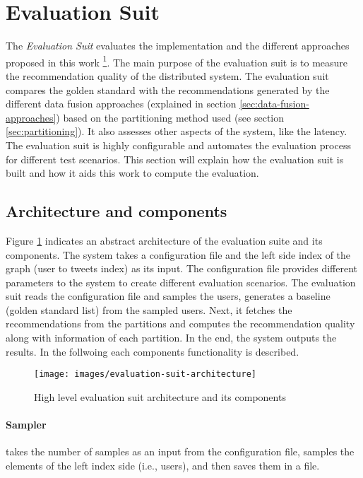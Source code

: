 \section{Evaluation Suit}
\label{sec:evaluation-suit}
The \emph{Evaluation Suit} evaluates the implementation and the different approaches proposed in this work \footnote{\url{https://github.com/ramin-master-thesis/evaluation}}. The main purpose of the evaluation suit is to measure the recommendation quality of the distributed system. The evaluation suit compares the golden standard with the recommendations generated by the different data fusion approaches (explained in section \ref{sec:data-fusion-approaches}) based on the partitioning method used (see section \ref{sec:partitioning}). It also assesses other aspects of the system, like the latency. The evaluation suit is highly configurable and automates the evaluation process for different test scenarios. This section will explain how the evaluation suit is built and how it aids this work to compute the evaluation.


\subsection{Architecture and components}
\label{sec:eval-suit-architecture-components}
Figure \ref{fig:evaluation-suit-architecture} indicates an abstract architecture of the evaluation suite and its components. The system takes a configuration file and the left side index of the graph (user to tweets index) as its input. The configuration file provides different parameters to the system to create different evaluation scenarios. The evaluation suit reads the configuration file and samples the users, generates a baseline (golden standard list) from the sampled users. Next, it fetches the recommendations from the partitions and computes the recommendation quality along with information of each partition. In the end, the system outputs the results. In the follwoing each components functionality is described.


\begin{figure}[!h]
	\centering
	\texttt{[image: images/evaluation-suit-architecture]}
	\caption{High level evaluation suit architecture and its components}
	\label{fig:evaluation-suit-architecture}
\end{figure}


\paragraph{Sampler}
takes the number of samples as an input from the configuration file, samples the elements of the left index side (i.e., users), and then saves them in a file.

